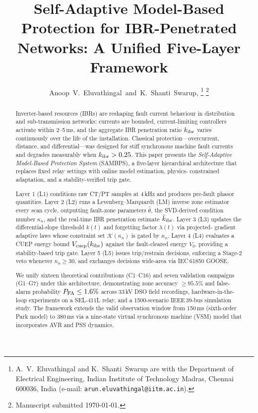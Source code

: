 \documentclass[journal,twoside,10pt]{IEEEtran}
\title{Self-Adaptive Model-Based Protection for IBR-Penetrated
       Networks: A Unified Five-Layer Framework}
\author{Anoop~V.~Eluvathingal~and~K.~Shanti~Swarup,%
  \thanks{A.~V.~Eluvathingal and K.~Shanti~Swarup are with the Department
  of Electrical Engineering, Indian Institute of Technology Madras,
  Chennai 600036, India (e-mail: \texttt{arun.eluvathingal@iitm.ac.in}).}
  \thanks{Manuscript submitted \today.}
  \IEEEmembership{Member, IEEE}}
\newcommand{\kappan}{\kappa_{n}}
\newcommand{\kibr}{k_{\rm ibr}}
\newcommand{\calK}{\mathcal{K}}
\newcommand{\hattheta}{\hat{\theta}}
\newcommand{\hatkibr}{\hat{k}_{\rm ibr}}
\begin{document}
\maketitle

\begin{abstract}
Inverter-based resources (IBRs) are reshaping fault current behaviour
in distribution and sub-transmission networks: currents are bounded,
current-limiting controllers activate within 2--5\,ms, and the
aggregate IBR penetration ratio $\kibr$ varies continuously over
the life of the installation.  Classical protection---overcurrent,
distance, and differential---was designed for stiff synchronous
machine fault currents and degrades measurably when $\kibr > 0.25$.
This paper presents the \emph{Self-Adaptive Model-Based Protection
System} (SAMBPS), a five-layer hierarchical architecture that
replaces fixed relay settings with online model estimation, physics-
constrained adaptation, and a stability-verified trip gate.

Layer 1 (L1) conditions raw CT/PT samples at 4\,kHz and produces
pre-fault phasor quantities.  Layer 2 (L2) runs a
Levenberg--Marquardt (LM) inverse zone estimator every scan cycle,
outputting fault-zone parameters $\hattheta$, the SVD-derived
condition number $\kappan$, and the real-time IBR penetration
estimate $\hatkibr$.  Layer 3 (L3) updates the differential-slope
threshold $k(t)$ and forgetting factor $\lambda(t)$ via projected-
gradient adaptive laws whose constraint set $\calK(\kappan)$ is
gated by $\kappan$.  Layer 4 (L4) evaluates a CUEP energy bound
$V_{\rm cuep}(\kibr)$ against the fault-cleared energy $V_0$,
providing a stability-based trip gate.  Layer 5 (L5) issues
trip/restrain decisions, enforcing a Stage-2 veto whenever
$\kappan \geq 30$, and exchanges decisions wide-area via IEC\,61850
GOOSE.

We unify sixteen theoretical contributions (C1--C16) and seven
validation campaigns (G1--G7) under this architecture, demonstrating
zone accuracy $\geq 95.5\%$ and false-alarm probability
$P_{\rm FA} \leq 1.6\%$ across 33\,kV DSO field recordings,
hardware-in-the-loop experiments on a SEL-411L relay, and a
1500-scenario IEEE\,39-bus simulation study.  The framework extends
the valid observation window from 150\,ms (sixth-order Park model)
to 380\,ms via a nine-state virtual synchronous machine (VSM) model
that incorporates AVR and PSS dynamics.
\end{abstract}
\end{document}

